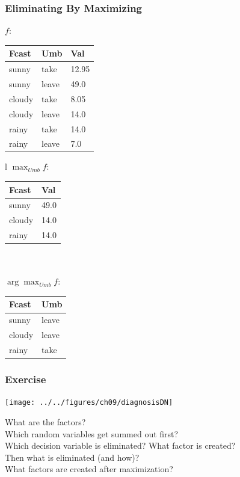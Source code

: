 \documentclass[12pt]{beamer} %
\begin{document}
\begin{frame}
\frametitle{Eliminating By Maximizing}
$f$: \begin{tabular}{|ll|l|}\hline
Fcast & Umb & Val\\\hline
sunny & take & 12.95\\
sunny & leave & 49.0\\
cloudy & take & 8.05\\
cloudy & leave & 14.0\\
rainy & take & 14.0\\
rainy & leave & 7.0\\\hline
\end{tabular}
\begin{tabular}{l}
$\max_{Umb} f$:
\begin{tabular}{|l|l|}\hline
Fcast & Val\\\hline
sunny & 49.0\\
cloudy & 14.0\\
rainy & 14.0\\\hline
\end{tabular}\\\\
$\arg\max_{Umb} f$:
\begin{tabular}{|l|l|}\hline
Fcast & Umb\\\hline
sunny & leave\\
cloudy & leave\\
rainy & take\\\hline
\end{tabular}

\end{tabular}
\end{frame}



\begin{frame}
\frametitle{Exercise}
\begin{center}
\texttt{[image: ../../figures/ch09/diagnosisDN]}
\end{center}
What are the factors?\\
Which random variables get summed out first?\\
Which decision variable is eliminated? What factor is created?\\
Then what is eliminated (and how)?\\
What factors are created after maximization?
\end{frame}
\end{document}
